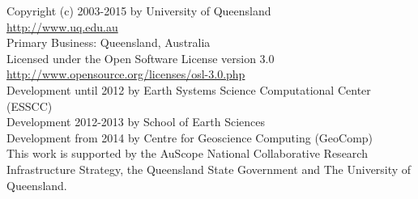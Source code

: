 
%
%
%

\begin{center}
Copyright (c) 2003-2015 by University of Queensland\\
\url{http://www.uq.edu.au}\\
Primary Business: Queensland, Australia\\
Licensed under the Open Software License version 3.0\\
\url{http://www.opensource.org/licenses/osl-3.0.php}\\
Development until 2012 by Earth Systems Science Computational Center (ESSCC)\\
Development 2012-2013 by School of Earth Sciences\\
Development from 2014 by Centre for Geoscience Computing (GeoComp)\\

This work is supported by the AuScope National Collaborative Research
Infrastructure Strategy, the Queensland State Government and The University
of Queensland.
\end{center}

